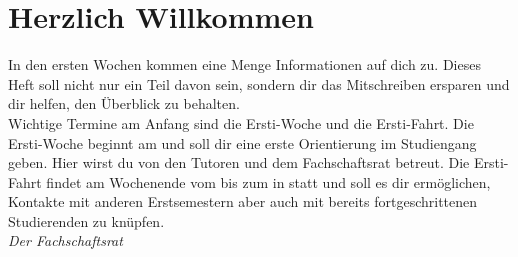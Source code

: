 \documentclass[8pt, twocolumn]{book}
\begin{document}


\pagestyle{fancy}  

\twocolumn
\section*{Herzlich Willkommen}

In den ersten Wochen kommen eine Menge Informationen auf dich zu. Dieses Heft soll nicht nur ein Teil davon sein, sondern dir das Mitschreiben ersparen und dir helfen, den Überblick zu behalten.\\
Wichtige Termine am Anfang sind die Ersti-Woche und die Ersti-Fahrt. Die Ersti-Woche beginnt am \makeDate{\firstDayOfFreshmenWeek} und soll dir eine erste Orientierung im Studiengang geben. Hier wirst du von den Tutoren und dem Fachschaftsrat betreut.
Die Ersti-Fahrt findet am Wochenende vom \makeDate{\firstDayOfExcursion} bis zum  \makeDate{\lastDayOfExcursion} in \excursionDestination statt und soll es dir ermöglichen, Kontakte mit anderen Erstsemestern aber auch mit bereits fortgeschrittenen Studierenden zu knüpfen.\\

\textit{Der Fachschaftsrat}

\clearpage


%
%
%
%
%
%
%
%
%
%
%
%
%
%
%
%
%
\end{document}
